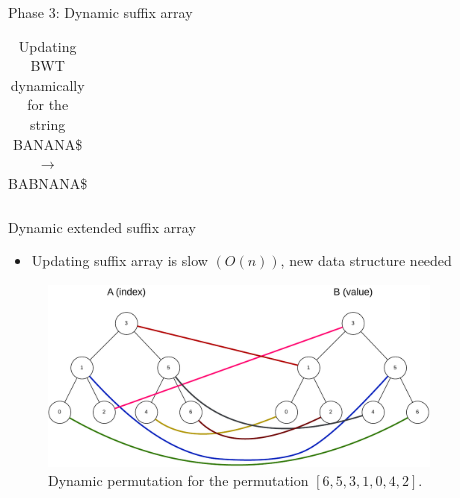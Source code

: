 \documentclass[aspectratio=1610, xcolor=table]{beamer}
\begin{document}
\begin{frame}[fragile]{Phase 3: Dynamic suffix array}
\begin{table}
\begin{center}
{\begin{tabular}{c | l | l l}
				\end{tabular}
			}
			\hspace{0.5cm}
			\caption{Updating BWT dynamically for the string BANANA\$ $\rightarrow$ BABNANA\$}
			\label{table:bwtupdatestages}
		\end{center}
	\end{table}
\end{frame}

\begin{frame}[fragile]{Dynamic extended suffix array}
    \begin{itemize}
        \item Updating suffix array is slow $(O(n))$, new data structure needed
    \end{itemize}
	\begin{figure}[t]
		\begin{center}
			\includegraphics[width=0.9\textwidth]{figures/dynamicpermutation.drawio.pdf}
		\end{center}
		\caption{Dynamic permutation for the permutation $[6,5,3,1,0,4,2]$.}
		\label{fig:dynamicpermutation}
	\end{figure}
\end{frame}
\end{document}
